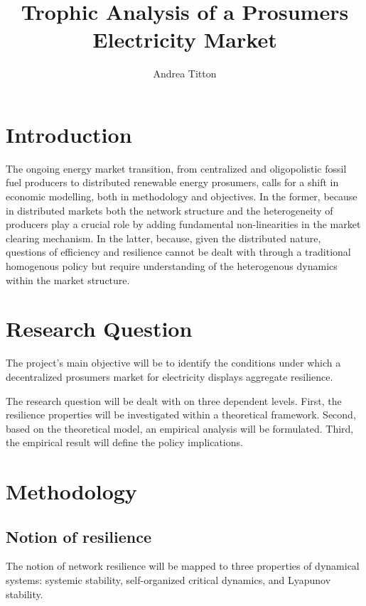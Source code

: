 \documentclass[american]{scrartcl}
\title{
        Trophic Analysis of a Prosumers Electricity Market
    }
\author{Andrea Titton}
\begin{document}
\nocite{*}
\maketitle

\section{Introduction}

The ongoing energy market transition, from centralized and oligopolistic fossil fuel producers to distributed renewable energy prosumers, calls for a shift in economic modelling, both in methodology and objectives. In the former, because in distributed markets both the network structure and the heterogeneity of producers play a crucial role by adding fundamental non-linearities in the market clearing mechanism. In the latter, because, given the distributed nature, questions of efficiency and resilience cannot be dealt with through a traditional homogenous policy but require understanding of the heterogenous dynamics within the market structure.

\section{Research Question}

The project's main objective will be to identify the conditions under which a decentralized prosumers market for electricity displays aggregate resilience.

The research question will be dealt with on three dependent levels. First, the resilience properties will be investigated within a theoretical framework. Second, based on the theoretical model, an empirical analysis will be formulated. Third, the empirical result will define the policy implications.

\section{Methodology}

\subsection{Notion of resilience}

The notion of network resilience will be mapped to three properties of dynamical systems: systemic stability, self-organized critical dynamics, and Lyapunov stability.
\end{document}
